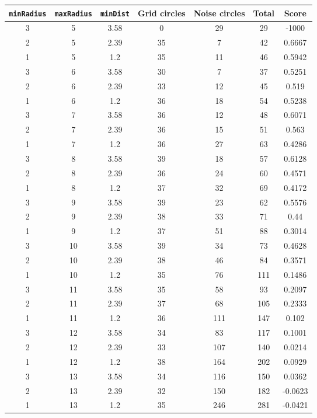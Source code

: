 \documentclass[letterpaper, 12pt]{article}
\begin{document}
\begin{longtable}{|c|c|c|c|c|c|c|}
\hline
\textbf{\texttt{minRadius}} & \textbf{\texttt{maxRadius}} & \textbf{\texttt{minDist}} & \textbf{Grid circles} & \textbf{Noise circles} & \textbf{Total} & \textbf{Score} \\
\hline
3 & 5 & 3.58 & 0 & 29 & 29 & -1000 \\
\hline
2 & 5 & 2.39 & 35 & 7 & 42 & 0.6667 \\
\hline
1 & 5 & 1.2 & 35 & 11 & 46 & 0.5942 \\
\hline
3 & 6 & 3.58 & 30 & 7 & 37 & 0.5251 \\
\hline
2 & 6 & 2.39 & 33 & 12 & 45 & 0.519 \\
\hline
1 & 6 & 1.2 & 36 & 18 & 54 & 0.5238 \\
\hline
3 & 7 & 3.58 & 36 & 12 & 48 & 0.6071 \\
\hline
2 & 7 & 2.39 & 36 & 15 & 51 & 0.563 \\
\hline
1 & 7 & 1.2 & 36 & 27 & 63 & 0.4286 \\
\hline
3 & 8 & 3.58 & 39 & 18 & 57 & 0.6128 \\
\hline
2 & 8 & 2.39 & 36 & 24 & 60 & 0.4571 \\
\hline
1 & 8 & 1.2 & 37 & 32 & 69 & 0.4172 \\
\hline
3 & 9 & 3.58 & 39 & 23 & 62 & 0.5576 \\
\hline
2 & 9 & 2.39 & 38 & 33 & 71 & 0.44 \\
\hline
1 & 9 & 1.2 & 37 & 51 & 88 & 0.3014 \\
\hline
3 & 10 & 3.58 & 39 & 34 & 73 & 0.4628 \\
\hline
2 & 10 & 2.39 & 38 & 46 & 84 & 0.3571 \\
\hline
1 & 10 & 1.2 & 35 & 76 & 111 & 0.1486 \\
\hline
3 & 11 & 3.58 & 35 & 58 & 93 & 0.2097 \\
\hline
2 & 11 & 2.39 & 37 & 68 & 105 & 0.2333 \\
\hline
1 & 11 & 1.2 & 36 & 111 & 147 & 0.102 \\
\hline
3 & 12 & 3.58 & 34 & 83 & 117 & 0.1001 \\
\hline
2 & 12 & 2.39 & 33 & 107 & 140 & 0.0214 \\
\hline
1 & 12 & 1.2 & 38 & 164 & 202 & 0.0929 \\
\hline
3 & 13 & 3.58 & 34 & 116 & 150 & 0.0362 \\
\hline
2 & 13 & 2.39 & 32 & 150 & 182 & -0.0623 \\
\hline
1 & 13 & 1.2 & 35 & 246 & 281 & -0.0421 \\

\end{longtable}
\end{document}
